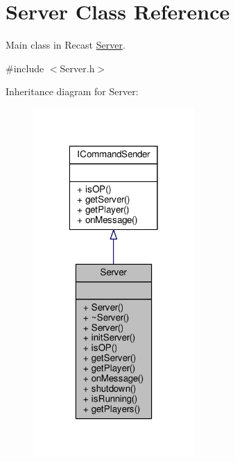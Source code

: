 \hypertarget{class_server}{\section{Server Class Reference}
\label{class_server}
}


Main class in Recast \hyperlink{class_server}{Server}.  




{\ttfamily \#include $<$Server.\-h$>$}



Inheritance diagram for Server\-:
\nopagebreak
\begin{figure}[H]
\begin{center}
\leavevmode
\includegraphics[width=174pt]{class_server__inherit__graph}
\end{center}
\end{figure}


